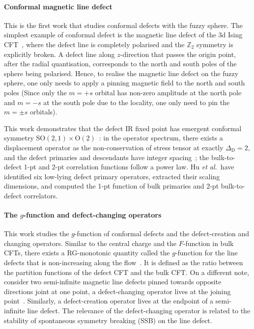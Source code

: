\documentclass{timesjhep}
\begin{document}
\paragraph{Conformal magnetic line defect~\cite{Hu2023Aug}}

This is the first work that studies conformal defects with the fuzzy sphere. The simplest example of conformal defect is the magnetic line defect of the 3d Ising CFT~\cite{Andreas2000MagLine,Allais2014MagLine,Allais2013MagLine,Pannell2023MagLine}, where the defect line is completely polarised and the $\mathbb{Z}_2$ symmetry is explicitly broken. A defect line along $z$-direction that passes the origin point, after the radial quantisation, corresponds to the north and south poles of the sphere being polarised. Hence, to realise the magnetic line defect on the fuzzy sphere, one only needs to apply a pinning magnetic field to the north and south poles (Since only the $m=+s$ orbital has non-zero amplitude at the north pole and $m=-s$ at the south pole due to the locality, one only need to pin the $m=\pm s$ orbitals).

This work demonstrates that the defect IR fixed point has emergent conformal symmetry $\mathrm{SO}(2,1)\times\mathrm{O}(2)$~: in the operator spectrum, there exists a displacement operator as the non-conservation of stress tensor at exactly $\Delta_\mathrm{D}=2$, and the defect primaries and descendants have integer spacing~; the bulk-to-defect 1-pt and 2-pt correlation functions follow a power law. Hu \textit{et al.}~have identified six low-lying defect primary operators, extracted their scaling dimensions, and computed the 1-pt function of bulk primaries and 2-pt bulk-to-defect correlators.

\paragraph{The $g$-function and defect-changing operators~\cite{Zhou2024Jan}}

This work studies the $g$-function of conformal defects and the defect-creation and changing operators. Similar to the central charge and the $F$-function in bulk CFTs, there exists a RG-monotonic quantity called the $g$-function for the line defects that is non-increasing along the flow~\cite{Cuomo2021gfn,Casini2022gfn}. It is defined as the ratio between the partition functions of the defect CFT and the bulk CFT. On a different note, consider two semi-infinite magnetic line defects pinned towards opposite directions joint at one point, a defect-changing operator lives at the joining point~\cite{Affleck1994DefCh,Affleck1996DefCh}. Similarly, a defect-creation operator lives at the endpoint of a semi-infinite line defect. The relevance of the defect-changing operator is related to the stability of spontaneous symmetry breaking (SSB) on the line defect.
\end{document}
